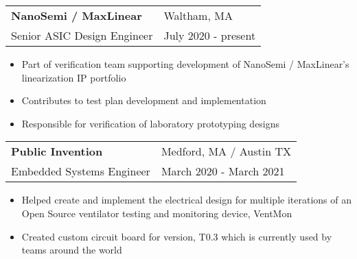 \documentclass[11pt]{article}
\begin{document}
\vspace{0.25cm}
\begin{tabularx}{\textwidth}{l R}
{\bf NanoSemi / MaxLinear} & Waltham, MA\\ 
Senior ASIC Design Engineer & July 2020 - present\\
\end{tabularx}  
\vspace{-0.5cm}
\begin{itemize}[noitemsep]
\item
Part of verification team supporting development of NanoSemi / MaxLinear's linearization IP portfolio
\item
Contributes to test plan development and implementation
\item
Responsible for verification of laboratory prototyping designs
\end{itemize}
\vspace{0.25cm}
\begin{tabularx}{\textwidth}{l R}
{\bf Public Invention} & Medford, MA / Austin TX\\ 
Embedded Systems Engineer & March 2020 - March 2021\\
\end{tabularx}  
\vspace{-0.5cm}
\begin{itemize}[noitemsep]
\item
Helped create and implement the electrical design for multiple iterations of an Open Source ventilator testing and monitoring device, VentMon
\item
Created custom circuit board for version, T0.3 which is currently used by teams around the world
\end{itemize}
\vspace{0.25cm}
\end{document}

